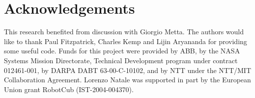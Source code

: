 \section*{Acknowledgements}
This research benefited from discussion with Giorgio Metta. 
The authors would like to thank Paul Fitzpatrick, Charles Kemp 
and Lijin Aryananda for providing some useful code. Funds for this 
project were provided by ABB, by the NASA Systems Mission Directorate,
Technical Development program under contract 012461-001, by 
DARPA DABT 63-00-C-10102, and by NTT under the NTT/MIT Collaboration 
Agreement. Lorenzo Natale was supported in part by the European Union 
grant RobotCub (IST-2004-004370).


